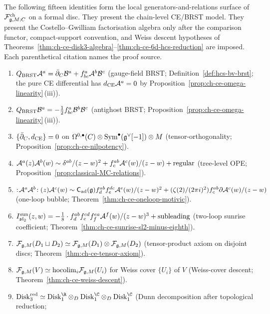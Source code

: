 The following fifteen identities form the local
generators-and-relations surface of $\mathcal{F}^{\mathrm{ch}}_{\mathfrak{g},M;C}$ on a
formal disc. They present the chain-level CE/BRST model. They present
the Costello--Gwilliam factorisation algebra only after the comparison
functor, compact-support convention, and Weiss descent hypotheses of
Theorems~\ref{thm:ch-ce-disk3-algebra}--\ref{thm:ch-ce-6d-hcs-reduction}
are imposed. Each parenthetical citation names the proof source.

\begin{enumerate}[label=\textup{(I\arabic*)},ref=I\arabic*]
\item\label{id:01}
$Q_{\mathrm{BRST}}\mathcal{A}^a = \bar\partial_C\mathcal{B}^a + f^a_{bc}\mathcal{A}^b\mathcal{B}^c$
(gauge-field BRST; Definition~\ref{def:hcs-bv-brst}; the pure CE
differential has $d_{\mathrm{CE}}\mathcal{A}^a=0$ by
Proposition~\ref{prop:ch-ce-omega-linearity}\,(iii)).
\item\label{id:02}
$Q_{\mathrm{BRST}}\mathcal{B}^a = -\tfrac12 f^a_{bc}\mathcal{B}^b\mathcal{B}^c$
(antighost BRST; Proposition~\ref{prop:ch-ce-omega-linearity}\,(iii)).
\item\label{id:03}
$\{\bar\partial_C, d_{\mathrm{CE}}\} = 0$ on
$\Omega^{0,\bullet}(C)\otimes\mathrm{Sym}^\bullet(\mathfrak{g}^\vee[-1])\otimes M$
(tensor-orthogonality; Proposition~\ref{prop:ch-ce-nilpotency}).
\item\label{id:04}
$\mathcal{A}^a(z)\mathcal{A}^b(w)\sim\delta^{ab}/(z-w)^2 + f^{ab}_c\mathcal{A}^c(w)/(z-w)
+ \mathrm{regular}$
(tree-level OPE; Proposition~\ref{prop:classical-MC-relations}).
\item\label{id:05}
$:\!\mathcal{A}^a\mathcal{A}^b\!:(z)\mathcal{A}^c(w)\sim\mathsf C_{\mathrm{ad}}(\mathfrak{g})
f^{ab}_d f^{dc}_e\mathcal{A}^e(w)/(z-w)^2 + (\zeta(2)/(2\pi i)^2) f^{ab}_c
\partial\mathcal{A}^c(w)/(z-w)$
(one-loop bubble; Theorem~\ref{thm:ch-ce-oneloop-motivic}).
\item\label{id:06}
$I^{\mathrm{sun}}_{\mathfrak{sl}_2}(z,w) = -\tfrac18\cdot f^{ab}_d f^{cd}_e
f^{ea}_f\mathcal{A}^f(w)/(z-w)^3 + \mathrm{subleading}$
(two-loop sunrise coefficient; Theorem~\ref{thm:ch-ce-sunrise-sl2-minus-eighth}).
\item\label{id:07}
$\mathcal{F}_{\mathfrak{g},M}(D_1\sqcup D_2)\simeq\mathcal{F}_{\mathfrak{g},M}(D_1)\otimes\mathcal{F}_{\mathfrak{g},M}(D_2)$
(tensor-product axiom on disjoint discs;
Theorem~\ref{thm:ch-ce-tensor-axiom}).
\item\label{id:08}
$\mathcal{F}_{\mathfrak{g},M}(V) \simeq \mathrm{hocolim}_i\mathcal{F}_{\mathfrak{g},M}(U_i)$ for Weiss cover
$\{U_i\}$ of $V$
(Weiss-cover descent; Theorem~\ref{thm:ch-ce-weiss-descent}).
\item\label{id:09}
$\Disk_3^{\mathrm{red}}\simeq
\Disk_1^{\R}\otimes_D\Disk_1^{\C}\otimes_D\Disk_1^{\C}$
(Dunn decomposition after topological reduction;

\end{enumerate}
